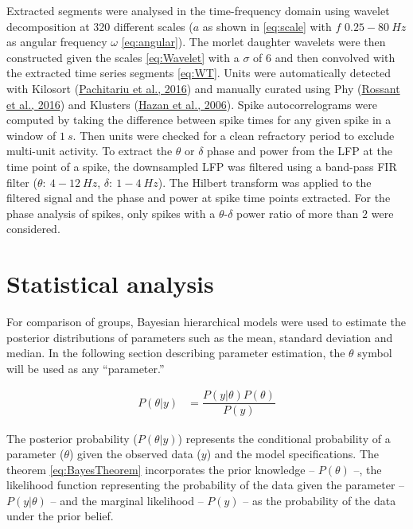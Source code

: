 \documentclass[
  12pt,
  a4paper,
  openany]{book}
\begin{document}
\noindent
Extracted segments were analysed in the time-frequency domain using wavelet decomposition at 320 different scales (\(a\) as shown in \eqref{eq:scale} with \(f\) \(0.25-80\ Hz\) as angular frequency \(\omega\) \eqref{eq:angular}). The morlet daughter wavelets were then constructed given the scales \eqref{eq:Wavelet} with a \(\sigma\) of \(6\) and then convolved with the extracted time series segments \eqref{eq:WT}. Units were automatically detected with Kilosort (\protect\hyperlink{ref-pachitariu_fast_2016}{Pachitariu et al., 2016}) and manually curated using Phy (\protect\hyperlink{ref-rossant_spike_2016}{Rossant et al., 2016}) and Klusters (\protect\hyperlink{ref-hazan_klusters_2006}{Hazan et al., 2006}). Spike autocorrelograms were computed by taking the difference between spike times for any given spike in a window of \(1\ s\). Then units were checked for a clean refractory period to exclude multi-unit activity. To extract the \(\theta\) or \(\delta\) phase and power from the LFP at the time point of a spike, the downsampled LFP was filtered using a band-pass FIR filter (\(\theta:\ 4-12\ Hz\), \(\delta:\ 1-4\ Hz\)). The Hilbert transform was applied to the filtered signal and the phase and power at spike time points extracted. For the phase analysis of spikes, only spikes with a \(\theta\)-\(\delta\) power ratio of more than \(2\) were considered.

\hypertarget{statistical-analysis}{%
\section{Statistical analysis}\label{statistical-analysis}}

For comparison of groups, Bayesian hierarchical models were used to estimate the posterior distributions of parameters such as the mean, standard deviation and median. In the following section describing parameter estimation, the \(\theta\) symbol will be used as any ``parameter.''

\begin{align}
P(\theta|y) &= \dfrac{P(y|\theta)P(\theta)}{P(y)}
\label{eq:BayesTheorem}
\end{align}

\noindent
The posterior probability (\(P(\theta|y)\)) represents the conditional probability of a parameter (\(\theta\)) given the observed data (\(y\)) and the model specifications. The theorem \eqref{eq:BayesTheorem} incorporates the prior knowledge -- \(P(\theta)\) --, the likelihood function representing the probability of the data given the parameter -- \(P(y|\theta)\) -- and the marginal likelihood -- \(P(y)\) -- as the probability of the data under the prior belief.
\end{document}
